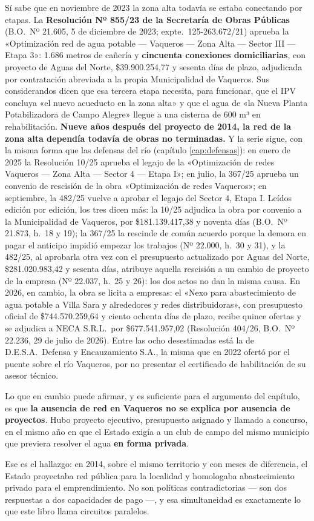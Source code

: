 \begin{cautela}
Sí sabe que en noviembre de 2023 la zona alta todavía se estaba conectando por etapas. La \textbf{Resolución Nº 855/23 de la Secretaría de Obras Públicas} (B.O.\ Nº 21.605, 5 de diciembre de 2023; expte.\ 125-263.672/21) aprueba la «Optimización red de agua potable --- Vaqueros --- Zona Alta --- Sector III --- Etapa 3»: 1.686 metros de cañería y \textbf{cincuenta conexiones domiciliarias}, con proyecto de Aguas del Norte, \$39.900.254,77 y sesenta días de plazo, adjudicada por contratación abreviada a la propia Municipalidad de Vaqueros. Sus considerandos dicen que esa tercera etapa necesita, para funcionar, que el IPV concluya «el nuevo acueducto en la zona alta» y que el agua de «la Nueva Planta Potabilizadora de Campo Alegre» llegue a una cisterna de 600 m³ en rehabilitación. \textbf{Nueve años después del proyecto de 2014, la red de la zona alta dependía todavía de obras no terminadas.} Y la serie sigue, con la misma forma que las defensas del río (capítulo \ref{cap:defensas}): en enero de 2025 la Resolución 10/25 aprueba el legajo de la «Optimización de redes Vaqueros --- Zona Alta --- Sector 4 --- Etapa I»; en julio, la 367/25 aprueba un convenio de rescisión de la obra «Optimización de redes Vaqueros»; en septiembre, la 482/25 vuelve a aprobar el legajo del Sector 4, Etapa I. Leídos edición por edición, los tres dicen más: la 10/25 adjudica la obra por convenio a la Municipalidad de Vaqueros, por \$181.139.417,38 y noventa días (B.O.\ Nº 21.873, h.\ 18 y 19); la 367/25 la rescinde de común acuerdo porque la demora en pagar el anticipo impidió empezar los trabajos (Nº 22.000, h.\ 30 y 31), y la 482/25, al aprobarla otra vez con el presupuesto actualizado por Aguas del Norte, \$281.020.983,42 y sesenta días, atribuye aquella rescisión a un cambio de proyecto de la empresa (Nº 22.037, h.\ 25 y 26): los dos actos no dan la misma causa. En 2026, en cambio, la obra se licita a empresas: el «Nexo para abastecimiento de agua potable a Villa Sara y alrededores y redes distribuidoras», con presupuesto oficial de \$744.570.259,64 y ciento ochenta días de plazo, recibe quince ofertas y se adjudica a NECA S.R.L.\ por \$677.541.957,02 (Resolución 404/26, B.O.\ Nº 22.236, 29 de julio de 2026). Entre las ocho desestimadas está la de D.E.S.A.\ Defensa y Encauzamiento S.A., la misma que en 2022 ofertó por el puente sobre el río Vaqueros, por no presentar el certificado de habilitación de su asesor técnico.

Lo que en cambio puede afirmar, y es suficiente para el argumento del capítulo, es que \textbf{la ausencia de red en Vaqueros no se explica por ausencia de proyectos}. Hubo proyecto ejecutivo, presupuesto asignado y llamado a concurso, en el mismo año en que el Estado exigía a un club de campo del mismo municipio que previera resolver el agua \textbf{en forma privada}.

Ese es el hallazgo: en 2014, sobre el mismo territorio y con meses de diferencia, el Estado proyectaba red pública para la localidad y homologaba abastecimiento privado para el emprendimiento. No son políticas contradictorias --- son dos respuestas a dos capacidades de pago ---, y esa simultaneidad es exactamente lo que este libro llama circuitos paralelos.
\end{cautela}

